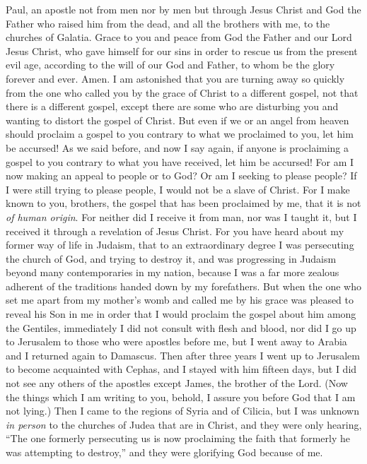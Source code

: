 
\begin{biblechapter} %
 Paul, an apostle not from men nor by men but through Jesus Christ and God the Father who raised him from the dead,
\verse and all the brothers with me, to the churches of Galatia.
\verse Grace to you and peace from God the Father and our Lord Jesus Christ,
\verse who gave himself for our sins in order to rescue us from the present evil age, according to the will of our God and Father,
\verse to whom be the glory forever and ever. Amen.
 I am astonished that you are turning away so quickly from the one who called you by the grace of Christ to a different gospel,
\verse not that there is a different gospel, except there are some who are disturbing you and wanting to distort the gospel of Christ.
\verse But even if we or an angel from heaven should proclaim a gospel to you contrary to what we proclaimed to you, let him be accursed!
\verse As we said before, and now I say again, if anyone is proclaiming a gospel to you contrary to what you have received, let him be accursed!
\verse For am I now making an appeal to people or to God? Or am I seeking to please people? If I were still trying to please people, I would not be a slave of Christ.
 For I make known to you, brothers, the gospel that has been proclaimed by me, that it is not \textit{of human origin}.
\verse For neither did I receive it from man, nor was I taught it, but I received it through a revelation of Jesus Christ.
\verse For you have heard about my former way of life in Judaism, that to an extraordinary degree I was persecuting the church of God, and trying to destroy it,
\verse and was progressing in Judaism beyond many contemporaries in my nation, because I was a far more zealous adherent of the traditions handed down by my forefathers.
\verse But when the one who set me apart from my mother’s womb and called me by his grace was pleased
\verse to reveal his Son in me in order that I would proclaim the gospel about him among the Gentiles, immediately I did not consult with flesh and blood,
\verse nor did I go up to Jerusalem to those who were apostles before me, but I went away to Arabia and I returned again to Damascus.
\verse Then after three years I went up to Jerusalem to become acquainted with Cephas, and I stayed with him fifteen days,
\verse but I did not see any others of the apostles except James, the brother of the Lord.
\verse (Now the things which I am writing to you, behold, I assure you before God that I am not lying.)
\verse Then I came to the regions of Syria and of Cilicia,
\verse but I was unknown \textit{in person} to the churches of Judea that are in Christ,
\verse and they were only hearing, “The one formerly persecuting us is now proclaiming the faith that formerly he was attempting to destroy,”
\verse and they were glorifying God because of me.
\end{biblechapter}

